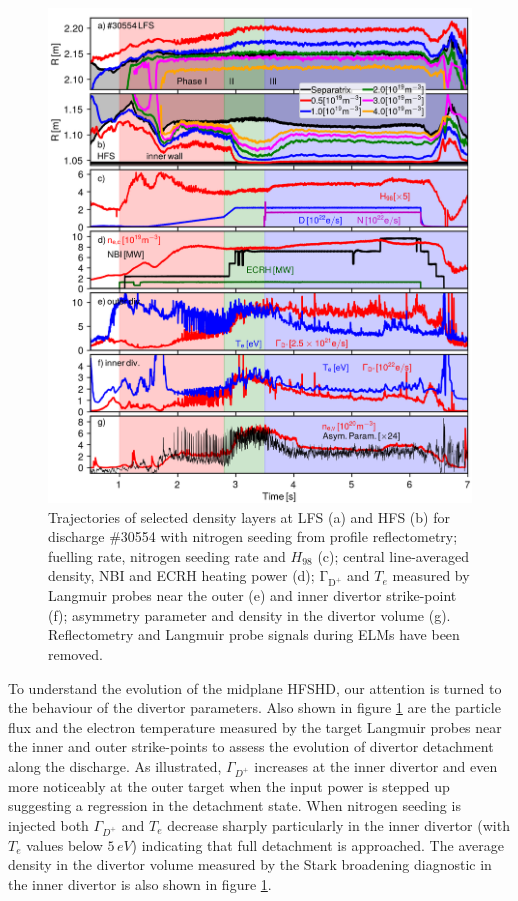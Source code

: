 \documentclass[12pt]{iopart}
\begin{document}
\begin{figure}[!bt]
\centering
\includegraphics[]{aeval_layers_30554.png}
\caption[Overview of discharge \#30554.]{Trajectories of selected density layers at LFS (a) and HFS (b) for discharge \#30554 with nitrogen seeding from profile reflectometry; fuelling rate, nitrogen seeding rate and $H_{98}$ (c); central line-averaged density, NBI and ECRH heating power (d); $\mathrm{\Gamma_{D^{+}}}$ and $T_e$ measured by Langmuir probes near the outer (e) and inner divertor strike-point (f); asymmetry parameter and density in the divertor volume (g). Reflectometry and Langmuir probe signals during ELMs have been removed.}
\label{fig:layers_nseed_30554}
\end{figure}

To understand the evolution of the midplane HFSHD, our attention is turned to the behaviour of the divertor parameters. Also shown in figure \ref{fig:layers_nseed_30554} are the particle flux and the electron temperature measured by the target Langmuir probes near the inner and outer strike-points to assess the evolution of divertor detachment along the discharge. As illustrated, $\Gamma_{D^{+}}$ increases at the inner divertor and even more noticeably at the outer target when the input power is stepped up suggesting a regression in the detachment state. When nitrogen seeding is injected both $\Gamma_{D^{+}}$ and $T_e$ decrease sharply particularly in the inner divertor (with $T_e$ values below $5\,eV$) indicating that full detachment is approached. The average density in the divertor volume measured by the Stark broadening diagnostic in the inner divertor is also shown in figure \ref{fig:layers_nseed_30554}.
\end{document}
